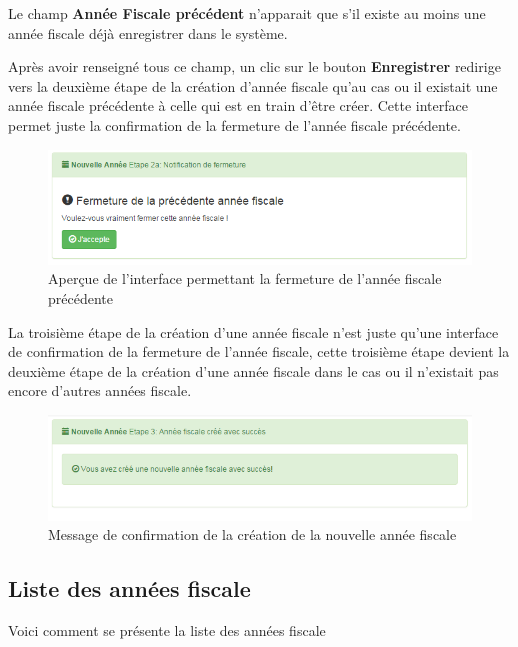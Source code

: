 \documentclass[12pt,a4paper]{report}
\begin{document}
Le champ \textbf{Année Fiscale précédent} n'apparait que s'il existe au moins une année fiscale déjà enregistrer dans le système. 

Après avoir renseigné tous ce champ, un clic sur le bouton \textbf{Enregistrer} redirige vers la deuxième étape de la création d'année fiscale qu'au cas ou il existait une année fiscale précédente à celle qui est en train d'être créer. Cette interface permet juste la confirmation de la fermeture de l'année fiscale précédente.

\begin{figure}[h]
\begin{center}
\includegraphics[width=12cm]{pic/CloseFiscYear.png}
\end{center}
\caption{Aperçue de l'interface permettant la fermeture de l'année fiscale précédente}
\label{Aperçue de l'interface permettant la fermeture de l'année fiscale précédente}
\end{figure}

La troisième étape de la création d'une année fiscale n'est juste qu'une interface de confirmation de la fermeture de l'année fiscale, cette troisième étape devient la deuxième étape de la création d'une année fiscale dans le cas ou il n'existait pas encore d'autres années fiscale.

\begin{figure}[h]
\begin{center}
\includegraphics[width=12cm]{pic/ConfirSucces.png}
\end{center}
\caption{Message de confirmation de la création de la nouvelle année fiscale}
\label{Message de confirmation de la création de la nouvelle année fiscale}
\end{figure}

\newpage

\subsection{Liste des années fiscale}
Voici comment se présente la liste des années fiscale
\end{document}
